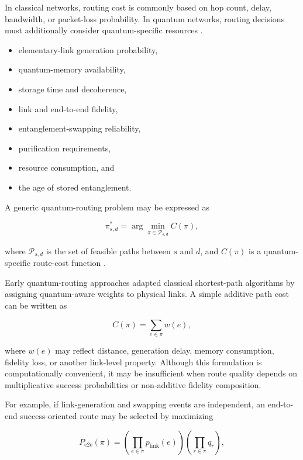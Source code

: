 In classical networks, routing cost is commonly based on hop count, delay, bandwidth, or packet-loss probability. In quantum networks, routing decisions must additionally consider quantum-specific resources \cite{halder2024optimal,wang2024fidelity}.
\begin{itemize}
    \item elementary-link generation probability,
    \item quantum-memory availability,
    \item storage time and decoherence,
    \item link and end-to-end fidelity,
    \item entanglement-swapping reliability,
    \item purification requirements,
    \item resource consumption, and
    \item the age of stored entanglement.
\end{itemize}

A generic quantum-routing problem may be expressed as

\begin{equation}
    \pi_{s,d}^{*}
    =
    \arg\min_{\pi \in \mathcal{P}_{s,d}}
    C(\pi),
\end{equation}

where $\mathcal{P}_{s,d}$ is the set of feasible paths between $s$ and $d$, and $C(\pi)$ is a quantum-specific route-cost function \cite{pant2019routing,halder2024optimal}.

Early quantum-routing approaches adapted classical shortest-path algorithms by assigning quantum-aware weights to physical links. A simple additive path cost can be written as

\begin{equation}
    C(\pi)
    =
    \sum_{e \in \pi}
    w(e),
\end{equation}

where $w(e)$ may reflect distance, generation delay, memory consumption, fidelity loss, or another link-level property. Although this formulation is computationally convenient, it may be insufficient when route quality depends on multiplicative success probabilities or non-additive fidelity composition.

For example, if link-generation and swapping events are independent, an end-to-end success-oriented route may be selected by maximizing

\begin{equation}
    P_{\mathrm{e2e}}(\pi)
    =
    \left(
    \prod_{e \in \pi}
    p_{\mathrm{link}}(e)
    \right)
    \left(
    \prod_{r \in \pi}
    q_r
    \right),
\end{equation}


